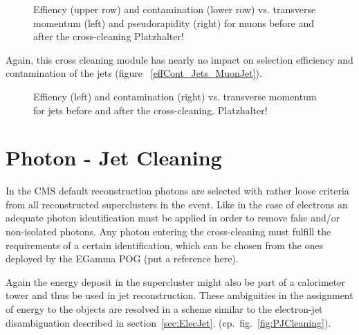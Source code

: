 \documentclass{cmspaper}
\begin{document}
\begin{figure}[hb]
\begin{center}
    \caption{Effiency (upper row) and contamination (lower row) vs. transverse momentum (left) and pseudorapidity (right) for muons before and after the cross-cleaning {\color{red}Platzhalter!}}
\label{fig:effCont_muon_MuonJet}
\end{center}
\end{figure}

Again, this cross cleaning module has nearly no impact on selection efficiency and contamination of the jets (figure ~\ref{effCont_Jets_MuonJet}).

\begin{figure}[hb]
\begin{center}
    \caption{Effiency (left) and contamination (right) vs. transverse momentum for jets before
    and after the cross-cleaning. {\color{red}Platzhalter!}}
\label{fig:effCont_Jets_MuonJet}
\end{center}
\end{figure}



\section{Photon - Jet Cleaning}
In the CMS default reconstruction photons are selected with rather loose criteria
from all reconstructed superclusters in the event. Like in the case of electrons
an adequate photon identification must be applied in order to remove fake and/or
non-isolated photons. Any photon entering the cross-cleaning must fulfill the
requirements of a certain identification, which can be chosen from the ones
deployed by the EGamma POG (put a reference here). 

Again the energy deposit in the supercluster might also be part of a
calorimeter tower and thus be used in jet reconstruction. These ambiguities in
the assignment of energy to the objects are resolved in a scheme similar to the
electron-jet disambiguation described in section~\ref{sec:ElecJet}. 
(cp.~fig.~\ref{fig:PJCleaning}).
\end{document}
